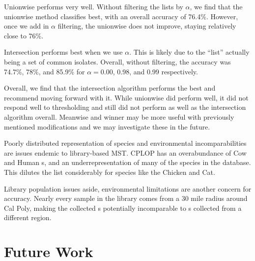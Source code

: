 Unionwise performs very well. Without filtering the \knnlong{} lists by $\alpha$, we find that the unionwise method classifies best, with an overall accuracy of 76.4\%. However, once we add in $\alpha$ filtering, the unionwise does not improve, staying relatively close to 76\%. 

Intersection performs best when we use $\alpha$. This is likely due to the ``list'' actually being a set of common isolates. Overall, without filtering, the accuracy was 74.7\%, 78\%, and 85.9\% for $\alpha = $0.00, 0.98, and 0.99 respectively. 

Overall, we find that the intersection algorithm performs the best and recommend moving forward with it. While unionwise did perform well, it did not respond well to thresholding and still did not perform as well as the intersection algorithm overall. Meanwise and winner may be more useful with previously mentioned modifications and we may investigate these in the future.


Poorly distributed representation of species and environmental incomparabilities are issues endemic to library-based MST. CPLOP has an overabundance of Cow and Human \isol{}s, and an underrepresentation of many of the species in the database. This dilutes the \knnlong{} list considerably for species like the Chicken and Cat. 

Library population issues aside, environmental limitations are another concern for accuracy. Nearly every sample in the library comes from a 30 mile radius around Cal Poly, making the collected \pyro{}s potentially incomparable to \pyro{}s collected from a different region.


\section{Future Work}